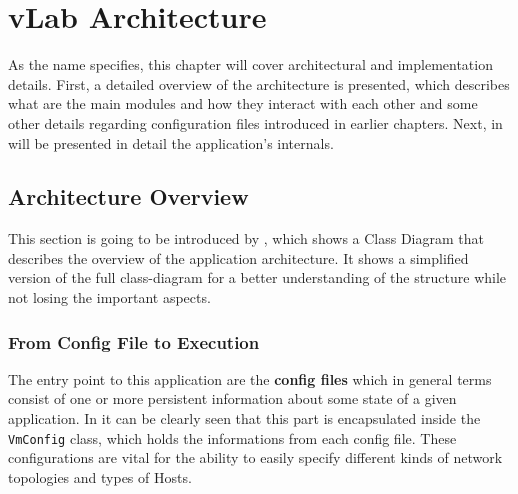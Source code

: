 \chapter{vLab Architecture}
\label{chapter:Chapter 4}

As the name specifies, this chapter will cover architectural and implementation details.
First, a detailed overview of the architecture is presented, which describes what are the main modules and how they interact with each other and some other details regarding configuration files introduced in earlier chapters.
Next, in  will be presented in detail the application's internals.

\section{Architecture Overview}
\label{sec:arh-overview}


This section is going to be introduced by , which shows a Class Diagram that describes the overview of the application architecture.
It shows a simplified version of the full class-diagram for a better understanding of the structure while not losing the important aspects.


\subsection{From Config File to Execution}
\label{sub-sec:arh-config-to-exec}

The entry point to this application are the \textbf{config files} which in general terms consist of one or more persistent information about some state of a given application.
In  it can be clearly seen that this part is encapsulated inside the \texttt{VmConfig} class, which holds the informations from each config file.
These configurations are vital for the ability to easily specify different kinds of network topologies and types of Hosts.

